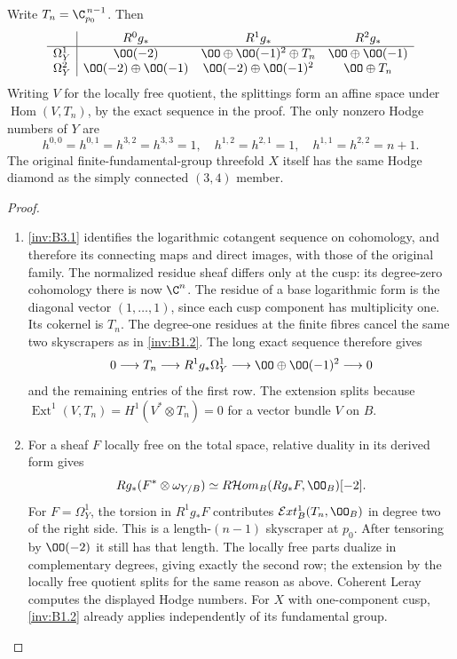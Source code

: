\begin{proposition}\hypertarget{tag-01S8}{}\label{inv:B3.2}

Write $T_n=\C_{p_0}^{\,n-1}$. Then
\[
\begin{array}{c|ccc}
 &R^0g_*&R^1g_*&R^2g_*\\\hline
\Omega^1_Y&\OO(-2)&\OO\oplus\OO(-1)^2\oplus T_n&\OO\oplus\OO(-1)\\
\Omega^2_Y&\OO(-2)\oplus\OO(-1)&\OO(-2)\oplus\OO(-1)^2&\OO\oplus T_n
\end{array}
\]
Writing $V$ for the locally free quotient, the splittings form an
affine space under $\operatorname{Hom}(V,T_n)$, by the exact
sequence in the proof.
The only nonzero Hodge numbers of $Y$ are
\[
h^{0,0}=h^{0,1}=h^{3,2}=h^{3,3}=1,\quad
h^{1,2}=h^{2,1}=1,\quad h^{1,1}=h^{2,2}=n+1.
\]
The original finite-fundamental-group threefold $X$ itself has the
same Hodge diamond as the simply connected $(3,4)$ member.
\end{proposition}


\begin{proof}
\begin{enumerate}[label=\arabic*.,leftmargin=*]
\item \ref{inv:B3.1} identifies the logarithmic cotangent sequence on cohomology,
and therefore its connecting maps and direct images, with those of
the original family. The normalized residue sheaf differs only at
the cusp: its degree-zero cohomology there is now $\C^n$.
The residue of a base logarithmic form is the diagonal vector
$(1,\ldots,1)$, since each cusp component has multiplicity one.
Its cokernel is $T_n$. The degree-one residues at the finite fibres
cancel the same two skyscrapers as in \ref{inv:B1.2}. The long exact sequence
therefore gives
\[
0\longrightarrow T_n\longrightarrow R^1g_*\Omega^1_Y
\longrightarrow\OO\oplus\OO(-1)^2\longrightarrow0
\]
and the remaining entries of the first row. The extension splits
because $\operatorname{Ext}^1(V,T_n)=H^1(V^*\otimes T_n)=0$
for a vector bundle $V$ on $B$.

\item For a sheaf $F$ locally free on the total space, relative duality
in its derived form gives
\[
Rg_*(F^*\otimes\omega_{Y/B})
\simeq R\mathcal Hom_B(Rg_*F,\OO_B)[-2].
\]
For $F=\Omega^1_Y$, the torsion in $R^1g_*F$ contributes
$\mathcal Ext^1_B(T_n,\OO_B)$ in degree two of the right side.
This is a length-$(n-1)$ skyscraper at $p_0$. After tensoring by
$\OO(-2)$ it still has that length. The locally free parts dualize
in complementary degrees, giving exactly the second row; the
extension by the locally free quotient splits for the same reason
as above. Coherent Leray computes the displayed Hodge numbers.
For $X$ with one-component cusp, \ref{inv:B1.2} already applies independently
of its fundamental group.
\end{enumerate}
\end{proof}